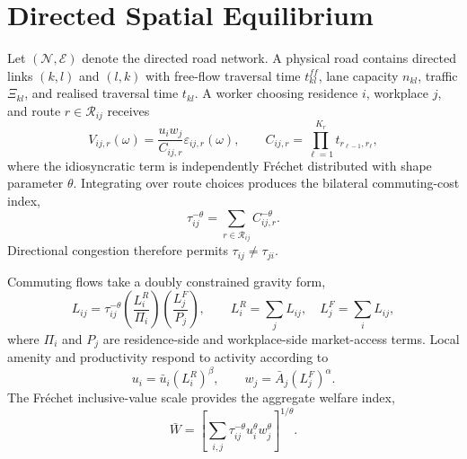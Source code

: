 \documentclass[12pt]{article}
\begin{document}
\section{Directed Spatial Equilibrium}

Let $(\mathcal{N},\mathcal{E})$ denote the directed road network. A physical road contains directed links $(k,l)$ and $(l,k)$ with free-flow traversal time $t_{kl}^{ff}$, lane capacity $n_{kl}$, traffic $\Xi_{kl}$, and realised traversal time $t_{kl}$. A worker choosing residence $i$, workplace $j$, and route $r\in\mathcal{R}_{ij}$ receives
\begin{equation}
  V_{ij,r}(\omega)=\frac{u_iw_j}{C_{ij,r}}\varepsilon_{ij,r}(\omega),
  \qquad
  C_{ij,r}=\prod_{\ell=1}^{K_r}t_{r_{\ell-1},r_\ell},
  \label{eq:utility}
\end{equation}
where the idiosyncratic term is independently Fr\'echet distributed with shape parameter $\theta$. Integrating over route choices produces the bilateral commuting-cost index,
\begin{equation}
  \tau_{ij}^{-\theta}=\sum_{r\in\mathcal{R}_{ij}}C_{ij,r}^{-\theta}.
  \label{eq:tau}
\end{equation}
Directional congestion therefore permits $\tau_{ij}\neq\tau_{ji}$.

Commuting flows take a doubly constrained gravity form,
\begin{equation}
  L_{ij}=\tau_{ij}^{-\theta}
  \left(\frac{L_i^R}{\Pi_i}\right)
  \left(\frac{L_j^F}{P_j}\right),
  \qquad
  L_i^R=\sum_jL_{ij},\quad L_j^F=\sum_iL_{ij},
  \label{eq:gravity}
\end{equation}
where $\Pi_i$ and $P_j$ are residence-side and workplace-side market-access terms. Local amenity and productivity respond to activity according to
\begin{equation}
  u_i=\bar u_i(L_i^R)^\beta,
  \qquad
  w_j=\bar A_j(L_j^F)^\alpha.
  \label{eq:fundamentals}
\end{equation}
The Fr\'echet inclusive-value scale provides the aggregate welfare index,
\begin{equation}
  \bar W=\left[\sum_{i,j}\tau_{ij}^{-\theta}u_i^\theta w_j^\theta\right]^{1/\theta}.
  \label{eq:welfare}
\end{equation}
\end{document}
